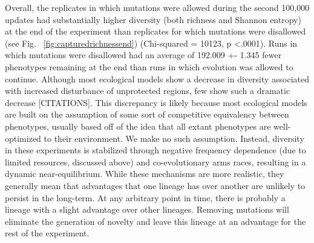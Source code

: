 \documentclass[letterpaper]{article}
\begin{document}
Overall, the replicates in which mutations were allowed during the second 100,000 updates had substantially higher diversity (both richness and Shannon entropy) at the end of the experiment than replicates for which mutations were disallowed (see Fig. ~\ref{fig:capturedrichnessend}) (Chi-squared = 10123, p \textless .0001). Runs in which mutations were disallowed had an average of 192.009 +- 1.345 fewer phenotypes remaining at the end than runs in which evolution was allowed to continue. Although most ecological models show a decrease in diversity associated with increased disturbance of unprotected regions, few show such a dramatic decrease [CITATIONS]. This discrepancy is likely because most ecological models are built on the assumption of some sort of competitive equivalency between phenotypes, usually based off of the idea that all extant phenotypes are well-optimized to their environment. We make no such assumption. Instead, diversity in these experiments is stabilized through negative frequency dependence (due to limited resources, discussed above) and co-evolutionary arms races, resulting in a dynamic near-equilibrium. While these mechanisms are more realistic, they generally mean that advantages that one lineage has over another are unlikely to persist in the long-term. At any arbitrary point in time, there is probably a lineage with a slight advantage over other lineages. Removing mutations will eliminate the generation of novelty and leave this lineage at an advantage for the rest of the experiment.
%
%
%
%
%
%
\end{document}
